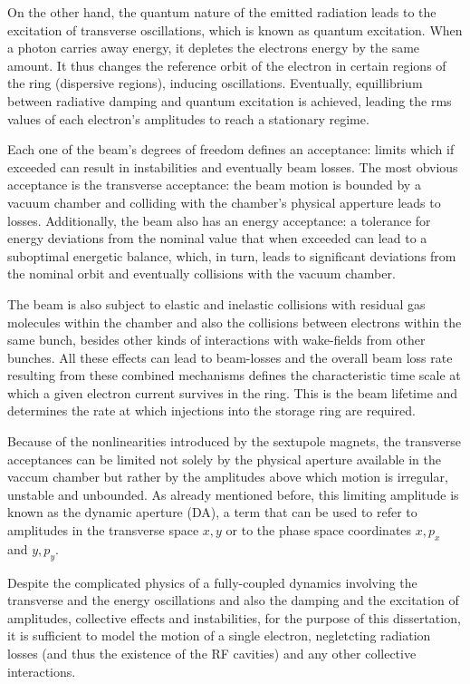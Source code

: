 On the other hand, the quantum nature of the emitted radiation leads to the excitation of transverse oscillations, which is known as quantum excitation. When a photon carries away energy, it depletes the electrons energy by the same amount. It thus changes the reference orbit of the electron in certain regions of the ring (dispersive regions), inducing oscillations. Eventually, equillibrium between radiative damping and quantum excitation is achieved, leading the rms values of each electron's amplitudes to reach a stationary regime.

Each one of the beam's degrees of freedom defines an acceptance: limits which if exceeded can result in instabilities and eventually beam losses. The most obvious acceptance is the transverse acceptance: the beam motion is bounded by a vacuum chamber and colliding with the chamber's physical apperture leads to losses. Additionally, the beam also has an energy acceptance: a tolerance for energy deviations from the nominal value that when exceeded can lead to a suboptimal energetic balance, which, in turn, leads to significant deviations from the nominal orbit and eventually collisions with the vacuum chamber.

The beam is also subject to elastic and inelastic collisions with residual gas molecules within the chamber and also the collisions between electrons within the same bunch, besides other kinds of interactions with wake-fields from other bunches. All these effects can lead to beam-losses and the overall beam loss rate resulting from these combined mechanisms defines the characteristic time scale at which a given electron current survives in the ring. This is the beam lifetime and determines the rate at which injections into the storage ring are required.

Because of the nonlinearities introduced by the sextupole magnets, the transverse acceptances can be limited not solely by the physical aperture available in the vaccum chamber but rather by the amplitudes above which motion is irregular, unstable and unbounded. As already mentioned before, this limiting amplitude is known as the dynamic aperture (DA), a term that can be used to refer to amplitudes in the transverse space $x,y$ or to the phase space coordinates $x, p_x$ and $y, p_y$.

Despite the complicated physics of a fully-coupled dynamics involving the transverse and the energy oscillations and also the damping and the excitation of amplitudes, collective effects and instabilities, for the purpose of this dissertation, it is sufficient to model the motion of a single electron, negletcting radiation losses (and thus the existence of the RF cavities) and any other collective interactions.

